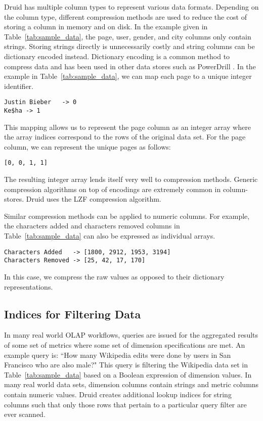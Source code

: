 \documentclass{sig-alternate-2013}
\begin{document}
Druid has multiple column types to represent various data formats. Depending on
the column type, different compression methods are used to reduce the cost of
storing a column in memory and on disk. In the example given in
Table~\ref{tab:sample_data}, the page, user, gender, and city columns only
contain strings. Storing strings directly is unnecessarily costly and string
columns can be dictionary encoded instead. Dictionary encoding is a common
method to compress data and has been used in other data stores such as
PowerDrill \cite{hall2012processing}. In the example in
Table~\ref{tab:sample_data}, we can map each page to a unique integer
identifier.
{\small\begin{verbatim}
Justin Bieber   -> 0
Ke$ha -> 1
\end{verbatim}}
This mapping allows us to represent the page column as an integer
array where the array indices correspond to the rows of the original
data set. For the page column, we can represent the unique
pages as follows:
{\small\begin{verbatim}
[0, 0, 1, 1]
\end{verbatim}}

The resulting integer array lends itself very well to
compression methods. Generic compression algorithms on top of encodings are
extremely common in column-stores. Druid uses the LZF \cite{liblzf2013} compression
algorithm.

Similar compression methods can be applied to numeric
columns. For example, the characters added and characters removed columns in
Table~\ref{tab:sample_data} can also be expressed as individual
arrays.
{\small\begin{verbatim}
Characters Added   -> [1800, 2912, 1953, 3194]
Characters Removed -> [25, 42, 17, 170]
\end{verbatim}}
In this case, we compress the raw values as opposed to their dictionary
representations.

\subsection{Indices for Filtering Data}
In many real world OLAP workflows, queries are issued for the aggregated
results of some set of metrics where some set of dimension specifications are
met. An example query is: ``How many Wikipedia edits were done by users in
San Francisco who are also male?" This query is filtering the Wikipedia data
set in Table~\ref{tab:sample_data} based on a Boolean expression of dimension
values. In many real world data sets, dimension columns contain strings and
metric columns contain numeric values. Druid creates additional lookup
indices for string columns such that only those rows that pertain to a
particular query filter are ever scanned.
\end{document}
